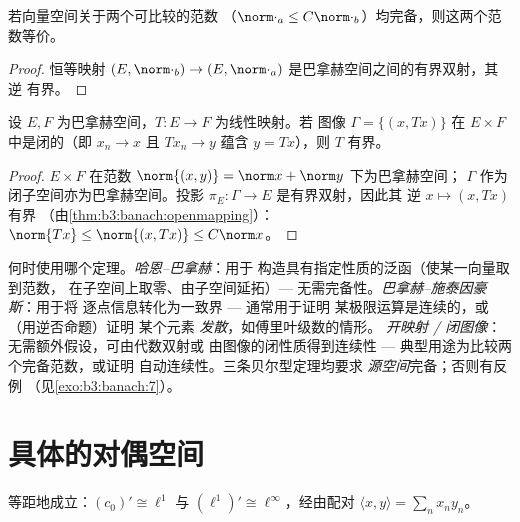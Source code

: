 \begin{corollary}[等价范数]\label{cor:b3:banach:equivnorms}
若向量空间关于两个可比较的范数
（$\norm\cdot_a \leq C\norm\cdot_b$）均完备，则这两个范数等价。
\end{corollary}

\begin{proof}
恒等映射 $(E, \norm\cdot_b) \to (E, \norm\cdot_a)$
是巴拿赫空间之间的有界双射，其逆
有界。
\end{proof}

\begin{theorem}[闭图像定理]\label{thm:b3:banach:closedgraph}
设 $E, F$ 为巴拿赫空间，$T \colon E \to F$ 为线性映射。若
图像 $\Gamma = \{(x, Tx)\}$ 在 $E \times F$ 中是闭的（即
$x_n \to x$ 且 $Tx_n \to y$ 蕴含 $y = Tx$），则 $T$
有界。
\end{theorem}

\begin{proof}
$E \times F$ 在范数 $\norm{(x,y)} = \norm x + \norm y$ 下为巴拿赫空间；
$\Gamma$ 作为闭子空间亦为巴拿赫空间。投影
$\pi_E\colon \Gamma \to E$ 是有界双射，因此其
逆 $x \mapsto (x, Tx)$ 有界
（由\cref{thm:b3:banach:openmapping}）：$\norm{Tx} \leq \norm{(x,
Tx)} \leq C\norm x$。
\end{proof}

\begin{method}\label{met:b3:banach:trilogy}
何时使用哪个定理。\emph{哈恩--巴拿赫}：用于
构造具有指定性质的泛函（使某一向量取到范数，
在子空间上取零、由子空间延拓）---
无需完备性。\emph{巴拿赫--施泰因豪斯}：用于将
逐点信息转化为一致界 --- 通常用于证明
某极限运算是连续的，或（用逆否命题）证明
某个元素 \emph{发散}，如傅里叶级数的情形。
\emph{开映射 / 闭图像}：无需额外假设，可由代数双射或
由图像的闭性质得到连续性 ---
典型用途为比较两个完备范数，或证明
自动连续性。三条贝尔型定理均要求
\emph{源空间}完备；否则有反例
（见\cref{exo:b3:banach:7}）。
\end{method}

\section{具体的对偶空间}

\begin{theorem}\label{thm:b3:banach:duals}
等距地成立：$(c_0)' \cong \ell^1$ 与 $(\ell^1)' \cong
\ell^\infty$，经由配对 $\langle x, y\rangle = \sum_n
x_ny_n$。
\end{theorem}

